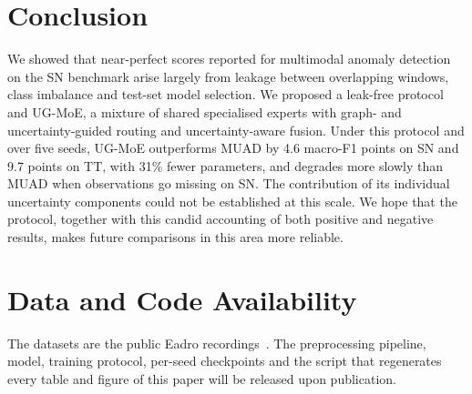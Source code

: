 \documentclass[journal]{IEEEtran}
\newcommand{\ugmoe}{UG-MoE}
\begin{document}
\section{Conclusion}
\label{sec:conclusion}
We showed that near-perfect scores reported for multimodal anomaly detection on the SN benchmark arise
largely from leakage between overlapping windows, class imbalance and test-set model selection. We proposed
a leak-free protocol and \ugmoe, a mixture of shared specialised experts with graph- and uncertainty-guided
routing and uncertainty-aware fusion. Under this protocol and over five seeds, \ugmoe{} outperforms MUAD by
4.6 macro-F1 points on SN and 9.7 points on TT, with 31\% fewer parameters, and degrades more slowly than MUAD
when observations go missing on SN. The contribution of its individual uncertainty components could not be
established at this scale. We hope that the protocol, together with this candid accounting of both positive and
negative results, makes future comparisons in this area more reliable.

\section*{Data and Code Availability}
The datasets are the public Eadro recordings~\cite{lee2023eadro}. The preprocessing pipeline, model, training
protocol, per-seed checkpoints and the script that regenerates every table and figure of this paper will be
released upon publication.



\end{document}
